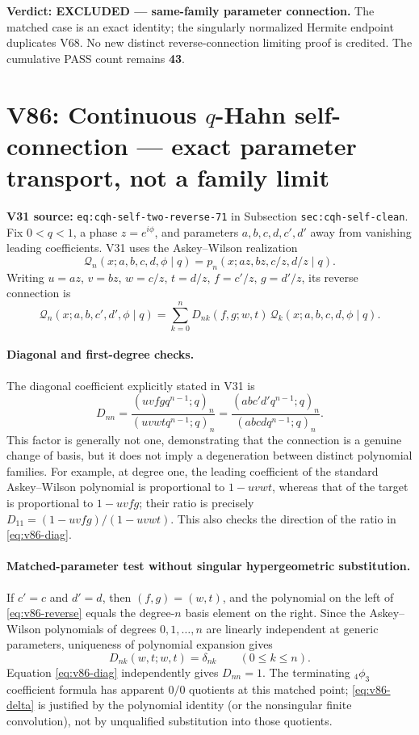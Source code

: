 \documentclass[11pt]{article}
\begin{document}
\noindent\textbf{Verdict: EXCLUDED --- same-family parameter connection.} The matched case is an exact identity; the singularly normalized Hermite endpoint duplicates V68. No new distinct reverse-connection limiting proof is credited. The cumulative PASS count remains \textbf{43}.


\section{V86: Continuous $q$-Hahn self-connection --- exact parameter transport, not a family limit}
\noindent\textbf{V31 source:} \texttt{eq:cqh-self-two-reverse-71} in Subsection \texttt{sec:cqh-self-clean}. Fix $0<q<1$, a phase $z=e^{i\phi}$, and parameters $a,b,c,d,c',d'$ away from vanishing leading coefficients. V31 uses the Askey--Wilson realization
\[
 \mathscr Q_n(x;a,b,c,d,\phi\mid q)
 =p_n(x;az,bz,c/z,d/z\mid q).
\]
Writing $u=az$, $v=bz$, $w=c/z$, $t=d/z$, $f=c'/z$, $g=d'/z$, its reverse connection is
\begin{equation}\label{eq:v86-reverse}
 \mathscr Q_n(x;a,b,c',d',\phi\mid q)
 =\sum_{k=0}^n D_{nk}(f,g;w,t)\,
 \mathscr Q_k(x;a,b,c,d,\phi\mid q).
\end{equation}
\paragraph{Diagonal and first-degree checks.}
The diagonal coefficient explicitly stated in V31 is
\begin{equation}\label{eq:v86-diag}
 D_{nn}=\frac{(uvfgq^{n-1};q)_n}{(uvwtq^{n-1};q)_n}
 =\frac{(abc'd'q^{n-1};q)_n}{(abcdq^{n-1};q)_n}.
\end{equation}
This factor is generally not one, demonstrating that the connection is a genuine change of basis, but it does not imply a degeneration between distinct polynomial families. For example, at degree one, the leading coefficient of the standard Askey--Wilson polynomial is proportional to $1-uvwt$, whereas that of the target is proportional to $1-uvfg$; their ratio is precisely $D_{11}=(1-uvfg)/(1-uvwt)$. This also checks the direction of the ratio in \eqref{eq:v86-diag}.
\paragraph{Matched-parameter test without singular hypergeometric substitution.}
If $c'=c$ and $d'=d$, then $(f,g)=(w,t)$, and the polynomial on the left of \eqref{eq:v86-reverse} equals the degree-$n$ basis element on the right. Since the Askey--Wilson polynomials of degrees $0,1,\ldots,n$ are linearly independent at generic parameters, uniqueness of polynomial expansion gives
\begin{equation}\label{eq:v86-delta}
 D_{nk}(w,t;w,t)=\delta_{nk}\qquad(0\le k\le n).
\end{equation}
Equation \eqref{eq:v86-diag} independently gives $D_{nn}=1$. The terminating ${}_4\phi_3$ coefficient formula has apparent $0/0$ quotients at this matched point; \eqref{eq:v86-delta} is justified by the polynomial identity (or the nonsingular finite convolution), not by unqualified substitution into those quotients.
\end{document}

